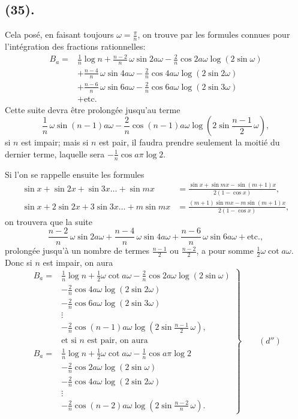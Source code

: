 \documentclass{article}
\begin{document}
\subsection*{(35).}

Cela posé, en faisant toujours $\omega=\frac{\pi}{n}$, on trouve par les formules connues pour l'intégration des fractions rationnelles:
\[ \begin{aligned} B_{a}={}&\frac{1}{n}\log n+\frac{n-2}{n}\,\omega\sin 2a\omega-\frac{2}{n}\cos 2a\omega\log(2\sin\omega)\\ &+\frac{n-4}{n}\,\omega\sin 4a\omega-\frac{2}{n}\cos 4a\omega\log(2\sin 2\omega)\\ &+\frac{n-6}{n}\,\omega\sin 6a\omega-\frac{2}{n}\cos 6a\omega\log(2\sin 3\omega)\\ &+\text{etc.} \end{aligned} \]
Cette suite devra être prolongée jusqu'au terme
\[ \frac{1}{n}\,\omega\sin(n-1)a\omega-\frac{2}{n}\cos(n-1)a\omega\log\left(2\sin\frac{n-1}{2}\,\omega\right), \]
si $n$ est impair; mais si $n$ est pair, il faudra prendre seulement la moitié du dernier terme, laquelle sera $-\frac{1}{n}\cos a\pi\log 2$.


Si l'on se rappelle ensuite les formules
\[ \begin{aligned} \sin x+\sin 2x+\sin 3x\ldots+\sin mx&=\frac{\sin x+\sin mx-\sin(m+1)x}{2(1-\cos x)},\\ \sin x+2\sin 2x+3\sin 3x\ldots+m\sin mx&=\frac{(m+1)\sin mx-m\sin(m+1)x}{2(1-\cos x)}, \end{aligned} \]
on trouvera que la suite
\[ \frac{n-2}{n}\,\omega\sin 2a\omega+\frac{n-4}{n}\,\omega\sin 4a\omega+\frac{n-6}{n}\,\omega\sin 6a\omega+\text{etc.}, \]
prolongée jusqu'à un nombre de termes $\frac{n-1}{2}$ ou $\frac{n-2}{2}$, a pour somme $\frac{1}{2}\omega\cot a\omega$. Donc si $n$ est impair, on aura
\[ \left.\begin{aligned} B_{a}={}&\frac{1}{n}\log n+\tfrac{1}{2}\omega\cot a\omega-\frac{2}{n}\cos 2a\omega\log(2\sin\omega)\\ &-\frac{2}{n}\cos 4a\omega\log(2\sin 2\omega)\\ &-\frac{2}{n}\cos 6a\omega\log(2\sin 3\omega)\\ &\vdots\\ &-\frac{2}{n}\cos(n-1)a\omega\log\left(2\sin\frac{n-1}{2}\,\omega\right),\\ &\text{et si } n \text{ est pair, on aura}\\ B_{a}={}&\frac{1}{n}\log n+\tfrac{1}{2}\omega\cot a\omega-\frac{1}{n}\cos a\pi\log 2\\ &-\frac{2}{n}\cos 2a\omega\log(2\sin\omega)\\ &-\frac{2}{n}\cos 4a\omega\log(2\sin 2\omega)\\ &\vdots\\ &-\frac{2}{n}\cos(n-2)a\omega\log\left(2\sin\frac{n-2}{n}\,\omega\right). \end{aligned}\right\}\qquad(d'') \]
\end{document}
